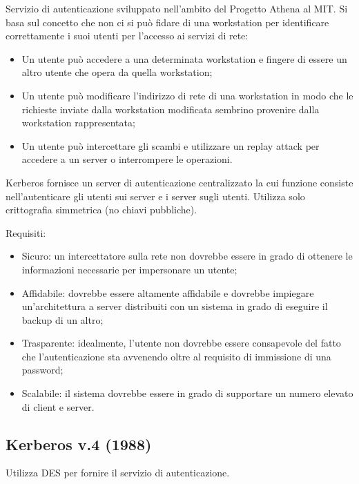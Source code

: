 Servizio di autenticazione sviluppato nell'ambito del Progetto Athena al MIT. Si basa sul concetto che non ci si può fidare di una workstation per identificare correttamente i suoi utenti per l'accesso ai servizi di rete:
\begin{itemize}
    \item Un utente può accedere a una determinata workstation e fingere di essere un altro utente che opera da quella workstation;
	\item Un utente può modificare l'indirizzo di rete di una workstation in modo che le richieste inviate dalla workstation modificata sembrino provenire dalla workstation rappresentata;
	\item Un utente può intercettare gli scambi e utilizzare un replay attack per accedere a un server o interrompere le operazioni.
\end{itemize}

Kerberos fornisce un server di autenticazione centralizzato la cui funzione consiste nell'autenticare gli utenti sui server e i server sugli utenti. Utilizza solo crittografia simmetrica (no chiavi pubbliche).

Requisiti:
\begin{itemize}
    \item Sicuro: un intercettatore sulla rete non dovrebbe essere in grado di ottenere le informazioni necessarie per impersonare un utente;
	\item Affidabile: dovrebbe essere altamente affidabile e dovrebbe impiegare un'architettura a server distribuiti con un sistema in grado di eseguire il backup di un altro;
	\item Trasparente: idealmente, l'utente non dovrebbe essere consapevole del fatto che l'autenticazione sta avvenendo oltre al requisito di immissione di una password;
	\item Scalabile: il sistema dovrebbe essere in grado di supportare un numero elevato di client e server.
\end{itemize}

\subsection{Kerberos v.4 (1988)}

Utilizza DES per fornire il servizio di autenticazione.

